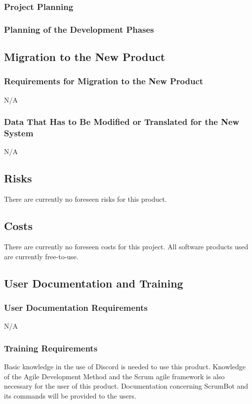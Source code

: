 \documentclass[12pt, titlepage]{article}
\begin{document}
\subsubsection{Project Planning}


\subsubsection{Planning of the Development Phases}


\subsection{Migration to the New Product}
\subsubsection{Requirements for Migration to the New Product}
N/A

\subsubsection{Data That Has to Be Modified or Translated for the New System}
N/A

\subsection{Risks}
There are currently no foreseen risks for this product.

\subsection{Costs}
There are currently no foreseen costs for this project. All software products used are currently free-to-use.

\subsection{User Documentation and Training}
\subsubsection{User Documentation Requirements}
N/A

\subsubsection{Training Requirements}
Basic knowledge in the use of Discord is needed to use this product. Knowledge of the Agile Development Method and the Scrum agile framework is also necessary for the user of this product. Documentation concerning ScrumBot and its commands will be provided to the users.
\end{document}
